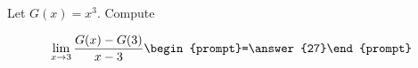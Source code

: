 \documentclass{ximera}
\author{Bart Snapp}
\begin{document}
\begin{exercise}
Let $G(x) = x^3$. Compute

\[
\lim_{ x\to 3 } 
\frac{G(x)-G(3)}{x-3} \begin{prompt}=\answer{27}\end{prompt}
\]
\end{exercise}
\end{document}
